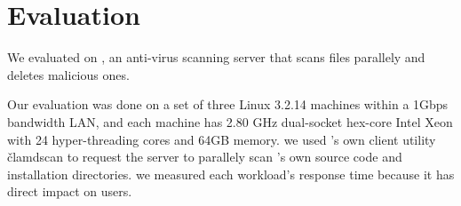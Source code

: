 \section{Evaluation} \label{sec:eval}


We evaluated \xxx on \clamav, an anti-virus scanning server that scans files 
parallely and deletes malicious ones.

Our evaluation was done on a set of three Linux 3.2.14 machines within a 1Gbps 
bandwidth LAN, and each machine has 2.80 GHz dual-socket hex-core Intel Xeon 
with 24 hyper-threading cores and 64GB memory. we used \clamav's own client 
utility \v{clamdscan} to request the server to parallely scan \clamav's own 
source code and installation directories. we measured each workload's 
response time because it has direct impact on users.
